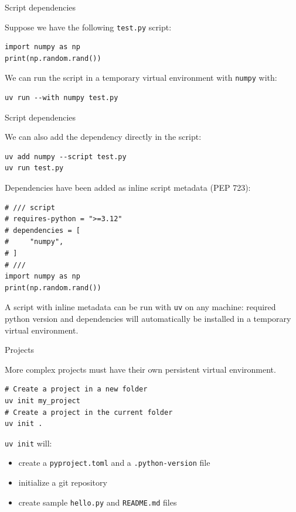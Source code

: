 \documentclass[aspectratio=169,xcolor=dvipsnames,svgnames,x11names,fleqn]{beamer}
\begin{document}
\begin{frame}[containsverbatim]{Script dependencies}

    Suppose we have the following \texttt{test.py} script:
    \begin{verbatim}
import numpy as np
print(np.random.rand())
    \end{verbatim}

    We can run the script in a temporary virtual environment with \texttt{numpy} with:
    \begin{verbatim}
uv run --with numpy test.py
    \end{verbatim}

\end{frame}

\begin{frame}[containsverbatim]{Script dependencies}

    \footnotesize

    We can also add the dependency directly in the script:
    \begin{verbatim}
uv add numpy --script test.py
uv run test.py
    \end{verbatim}

    Dependencies have been added as inline script metadata (PEP 723):
    \begin{verbatim}
# /// script
# requires-python = ">=3.12"
# dependencies = [
#     "numpy",
# ]
# ///
import numpy as np
print(np.random.rand())
    \end{verbatim}


\begin{center}
    A script with inline metadata can be run with \texttt{uv} on any machine: required python version and dependencies will automatically 
    be installed in a temporary virtual environment.
\end{center}

\end{frame}


\begin{frame}[containsverbatim]{Projects}

    More complex projects must have their own persistent virtual environment.
    \begin{verbatim}
# Create a project in a new folder
uv init my_project
# Create a project in the current folder
uv init .
    \end{verbatim}

    \bigskip
    \texttt{uv init} will:
    \begin{itemize}
        \item create a \texttt{pyproject.toml} and a \texttt{.python-version} file
        \item initialize a git repository
        \item create sample \texttt{hello.py} and \texttt{README.md} files
    \end{itemize}

\end{frame}
\end{document}

